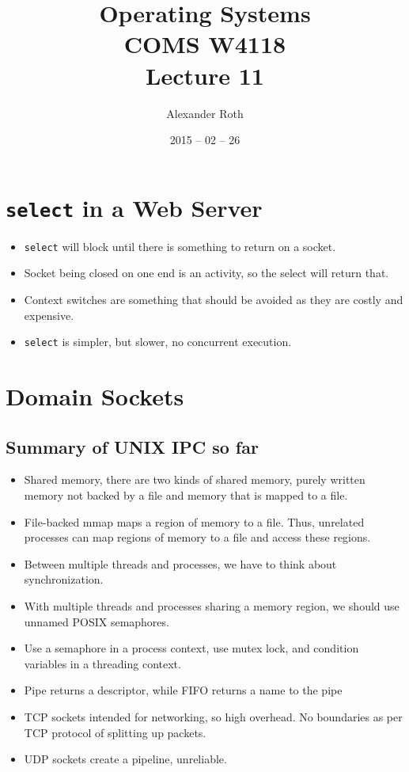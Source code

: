 \documentclass[]{article}
\begin{document}
\newcommand{\code}{\texttt}
\newtheorem{thm}{Theorem}
\title{Operating Systems \\ COMS W4118 \\ Lecture 11}
\author{Alexander Roth}
\date{2015 -- 02 -- 26}
\maketitle

\section{\code{select} in a Web Server}
\begin{itemize}
\item \code{select} will block until there is something to return on a socket.
\item Socket being closed on one end is an activity, so the select will return
that.
\item Context switches are something that should be avoided as they are costly
and expensive.
\item \code{select} is simpler, but slower, no concurrent execution.
\end{itemize}

\section{Domain Sockets}
\subsection{Summary of UNIX IPC so far}
\begin{itemize}
\item Shared memory, there are two kinds of shared memory, purely written memory
not backed by a file and memory that is mapped to a file.
\item File-backed mmap maps a region of memory to a file. Thus, unrelated
processes can map regions of memory to a file and access these regions.
\item Between multiple threads and processes, we have to think about
synchronization.
\item With multiple threads and processes sharing a memory region, we should use
unnamed POSIX semaphores.
\item Use a semaphore in a process context, use mutex lock, and condition
variables in a threading context.
\item Pipe returns a descriptor, while FIFO returns a name to the pipe
\item TCP sockets intended for networking, so high overhead. No boundaries as
per TCP protocol of splitting up packets.
\item UDP sockets create a pipeline, unreliable.
\end{itemize}
\end{document}
